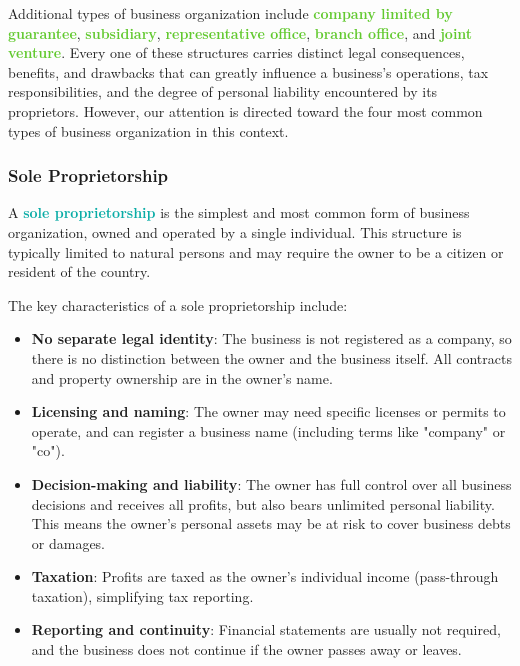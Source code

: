 \documentclass[twoside]{article}
\newcommand{\highlightbluetext}[1]{\textcolor[HTML]{09ACA6}{\textbf{#1}}}
\newcommand{\highlightgreentext}[1]{\textcolor[HTML]{62C92F}{\textbf{#1}}}
\numberwithin{equation}{section}
\begin{document}
	Additional types of business organization include \highlightgreentext{company limited by guarantee}, \highlightgreentext{subsidiary}, \highlightgreentext{representative office}, \highlightgreentext{branch office}, and \highlightgreentext{joint venture}. Every one of these structures carries distinct legal consequences, benefits, and drawbacks that can greatly influence a business's operations, tax responsibilities, and the degree of personal liability encountered by its proprietors. However, our attention is directed toward the four most common types of business organization in this context.

	\subsubsection{Sole Proprietorship}
	\label{subsubsec:SoleProprietorship}
	A \highlightbluetext{sole proprietorship} is the simplest and most common form of business organization, owned and operated by a single individual. This structure is typically limited to natural persons and may require the owner to be a citizen or resident of the country.

	The key characteristics of a sole proprietorship include:
	\begin{itemize}
		\item \textbf{No separate legal identity}: The business is not registered as a company, so there is no distinction between the owner and the business itself. All contracts and property ownership are in the owner's name.
		\item \textbf{Licensing and naming}: The owner may need specific licenses or permits to operate, and can register a business name (including terms like "company" or "co").
		\item \textbf{Decision-making and liability}: The owner has full control over all business decisions and receives all profits, but also bears unlimited personal liability. This means the owner's personal assets may be at risk to cover business debts or damages.
		\item \textbf{Taxation}: Profits are taxed as the owner's individual income (pass-through taxation), simplifying tax reporting.
		\item \textbf{Reporting and continuity}: Financial statements are usually not required, and the business does not continue if the owner passes away or leaves.
	\end{itemize}
\end{document}
